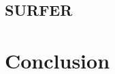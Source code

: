\documentclass[11pt]{article}
\begin{document}
\subsection{SURFER}

\section{Conclusion}



\end{document}
